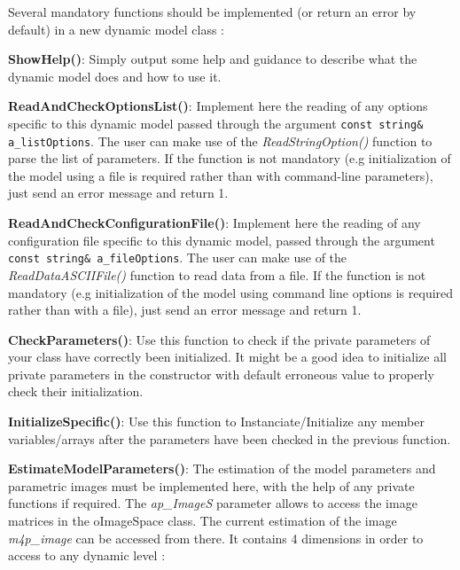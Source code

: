 \documentclass[a4paper, 11pt]{article}
\begin{document}
Several mandatory functions should be implemented (or return an error by default) in a new dynamic model class :

\begin{description}
\item \textbf{ShowHelp()}: Simply output some help and guidance to describe what the dynamic model does and how to use it.

\item \textbf{ReadAndCheckOptionsList()}: Implement here the reading of any options specific to this dynamic model passed through the argument \texttt{const string\& a\_listOptions}. The user can make use of the \textit{ReadStringOption()} function to parse the list of parameters. If the function is not mandatory (e.g initialization of the model using a file is required rather than with command-line parameters), just send an error message and return 1.

\item \textbf{ReadAndCheckConfigurationFile()}: Implement here the reading of any configuration file specific to this dynamic model, passed through the argument \texttt{const string\& a\_fileOptions}. The user can make use of the \textit{ReadDataASCIIFile()} function to read data from a file. If the function is not mandatory (e.g initialization of the model using command line options is required rather than with a file), just send an error message and return 1.

\item \textbf{CheckParameters()}: Use this function to check if the private parameters of your class have correctly been initialized. It might be a good idea to initialize all private parameters in the constructor with default erroneous value to properly check their initialization.

\item \textbf{InitializeSpecific()}: Use this function to Instanciate/Initialize any member variables/arrays after the parameters have been checked in the previous function.
  
\item \textbf{EstimateModelParameters()}: The estimation of the model parameters and parametric images must be implemented here, with the help of any private functions if required. The \textit{ap\_ImageS} parameter allows to access the image matrices in the oImageSpace class. The current estimation of the image \textit{m4p\_image} can be accessed from there. It contains 4 dimensions in order to access to any dynamic level : 


\end{description}
\end{document}

